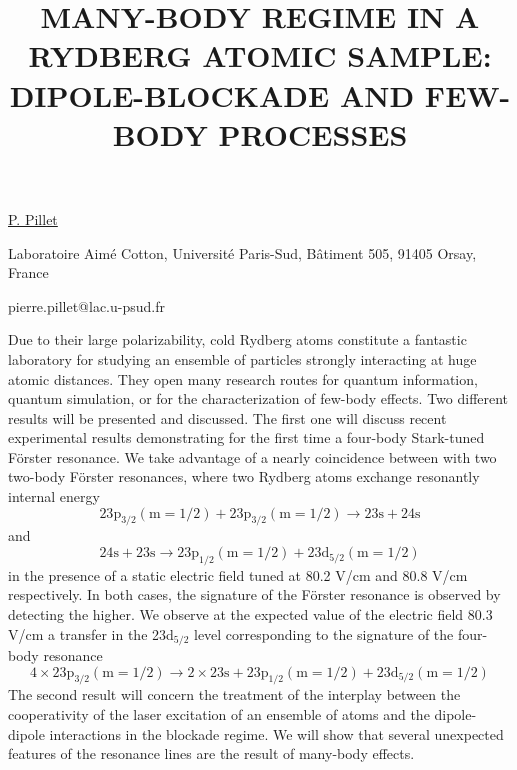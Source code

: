 \title{MANY-BODY REGIME IN A RYDBERG ATOMIC SAMPLE: DIPOLE-BLOCKADE AND FEW-BODY PROCESSES}

\underline{P. Pillet} 

{\normalsize{\vspace{-4mm}
Laboratoire Aim\'e Cotton, Universit\'e Paris-Sud, B\^atiment 505, 91405 Orsay, France

\email pierre.pillet@lac.u-psud.fr}}

Due to their large polarizability, cold Rydberg atoms constitute a fantastic laboratory for studying an
ensemble of particles strongly interacting at huge atomic distances. They open many research routes
for quantum information, quantum simulation, or for the characterization of few-body effects. Two
different results will be presented and discussed.
The first one will discuss recent experimental results demonstrating for the first time a four-body
Stark-tuned F\"{o}rster resonance. We take advantage of a nearly coincidence between with two two-body
F\"{o}rster resonances, where two Rydberg atoms exchange resonantly internal energy
\[23\text{p}_{3/2}(\text{m} = 1/2) + 23\text{p}_{3/2}(\text{m} = 1/2) \rightarrow 23\text{s} + 24\text{s}\]
and
\[24\text{s} + 23\text{s} \rightarrow 23\text{p}_{1/2}(\text{m} = 1/2) + 23\text{d}_{5/2}(\text{m} = 1/2)\]
in the presence of a static electric field tuned at 80.2 V/cm and 80.8 V/cm respectively. In both cases,
the signature of the F\"{o}rster resonance is observed by detecting the higher. We observe at the
expected value of the electric field 80.3 V/cm a transfer in the 23d$_{5/2}$ level corresponding to the
signature of the four-body resonance
\[
4\times 23\text{p}_{3/2}(\text{m} = 1/2) \rightarrow 2\times 23\text{s} + 23\text{p}_{1/2} (\text{m}=1/2) + 23\text{d}_{5/2}(\text{m} = 1/2)\]
The second result will concern the treatment of the interplay between the cooperativity of the laser
excitation of an ensemble of atoms and the dipole-dipole interactions in the blockade regime. We
will show that several unexpected features of the resonance lines are the result of many-body
effects.

\vspace{\baselineskip} 